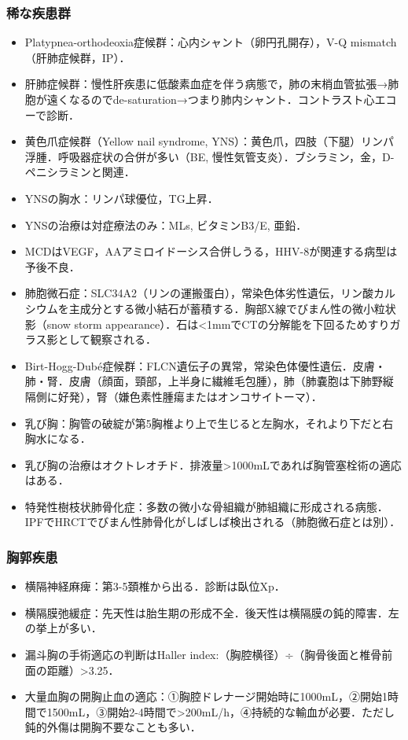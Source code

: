 \subsubsection{稀な疾患群}

\begin{itemize}
\item Platypnea-orthodeoxia症候群：心内シャント（卵円孔開存），V-Q mismatch（肝肺症候群，IP）．
\item 肝肺症候群：慢性肝疾患に低酸素血症を伴う病態で，肺の末梢血管拡張→肺胞が遠くなるのでde-saturation→つまり肺内シャント．コントラスト心エコーで診断．
\item 黄色爪症候群（Yellow nail syndrome, YNS）：黄色爪，四肢（下腿）リンパ浮腫．呼吸器症状の合併が多い（BE, 慢性気管支炎）．ブシラミン，金，D-ペニシラミンと関連．
\item YNSの胸水：リンパ球優位，TG上昇．
\item YNSの治療は対症療法のみ：MLs, ビタミンB3/E, 亜鉛．
\item MCDはVEGF，AAアミロイドーシス合併しうる，HHV-8が関連する病型は予後不良．
\item 肺胞微石症：SLC34A2（リンの運搬蛋白），常染色体劣性遺伝，リン酸カルシウムを主成分とする微小結石が蓄積する．胸部X線でびまん性の微小粒状影（snow storm appearance）．石は<1mmでCTの分解能を下回るためすりガラス影として観察される．
\item Birt-Hogg-Dubé症候群：FLCN遺伝子の異常，常染色体優性遺伝．皮膚・肺・腎．皮膚（顔面，頸部，上半身に繊維毛包腫），肺（肺嚢胞は下肺野縦隔側に好発），腎（嫌色素性腫瘍またはオンコサイトーマ）．
\item 乳び胸：胸管の破綻が第5胸椎より上で生じると左胸水，それより下だと右胸水になる．
\item 乳び胸の治療はオクトレオチド．排液量>1000mLであれば胸管塞栓術の適応はある．
\item 特発性樹枝状肺骨化症：多数の微小な骨組織が肺組織に形成される病態．IPFでHRCTでびまん性肺骨化がしばしば検出される（肺胞微石症とは別）．
\end{itemize}


\subsubsection{胸郭疾患}

\begin{itemize}
\item 横隔神経麻痺：第3-5頚椎から出る．診断は臥位Xp．
\item 横隔膜弛緩症：先天性は胎生期の形成不全．後天性は横隔膜の鈍的障害．左の挙上が多い．
\item 漏斗胸の手術適応の判断はHaller index:（胸腔横径）÷（胸骨後面と椎骨前面の距離）>3.25．
\item 大量血胸の開胸止血の適応：①胸腔ドレナージ開始時に1000mL，②開始1時間で1500mL，③開始2-4時間で>200mL/h，④持続的な輸血が必要．ただし鈍的外傷は開胸不要なことも多い．
\end{itemize}


